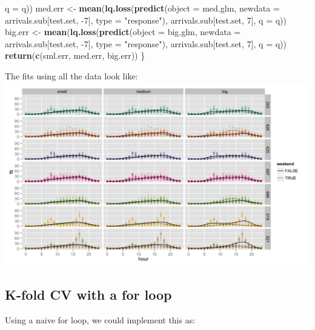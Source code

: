\documentclass[]{article}
\newenvironment{Shaded}{\begin{snugshade}}{\end{snugshade}}
\newcommand{\KeywordTok}[1]{\textcolor[rgb]{0.13,0.29,0.53}{\textbf{{#1}}}}
\newcommand{\DataTypeTok}[1]{\textcolor[rgb]{0.13,0.29,0.53}{{#1}}}
\newcommand{\DecValTok}[1]{\textcolor[rgb]{0.00,0.00,0.81}{{#1}}}
\newcommand{\StringTok}[1]{\textcolor[rgb]{0.31,0.60,0.02}{{#1}}}
\newcommand{\NormalTok}[1]{{#1}}
\begin{document}
\begin{Shaded}
\begin{Highlighting}[]
                            \DataTypeTok{q =} \NormalTok{q))}
    \NormalTok{med.err <-}\StringTok{ }\KeywordTok{mean}\NormalTok{(}\KeywordTok{lq.loss}\NormalTok{(}\KeywordTok{predict}\NormalTok{(}\DataTypeTok{object =} \NormalTok{med.glm,}
                                    \DataTypeTok{newdata =} \NormalTok{arrivals.sub[test.set, -}\DecValTok{7}\NormalTok{],}
                                    \DataTypeTok{type =} \StringTok{"response"}\NormalTok{),}
                            \NormalTok{arrivals.sub[test.set, }\DecValTok{7}\NormalTok{],}
                            \DataTypeTok{q =} \NormalTok{q))}
    \NormalTok{big.err <-}\StringTok{ }\KeywordTok{mean}\NormalTok{(}\KeywordTok{lq.loss}\NormalTok{(}\KeywordTok{predict}\NormalTok{(}\DataTypeTok{object =} \NormalTok{big.glm,}
                                    \DataTypeTok{newdata =} \NormalTok{arrivals.sub[test.set, -}\DecValTok{7}\NormalTok{],}
                                    \DataTypeTok{type =} \StringTok{"response"}\NormalTok{),}
                            \NormalTok{arrivals.sub[test.set, }\DecValTok{7}\NormalTok{],}
                            \DataTypeTok{q =} \NormalTok{q))}
    \KeywordTok{return}\NormalTok{(}\KeywordTok{c}\NormalTok{(sml.err, med.err, big.err))}
\NormalTok{\}}
\end{Highlighting}
\end{Shaded}

The fits using all the data look like:
\includegraphics{../fig/fit_all.png}

\subsection{K-fold CV with a for loop}\label{k-fold-cv-with-a-for-loop}

Using a naive for loop, we could implement this as:
\end{document}
